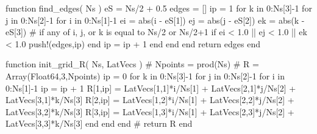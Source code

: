 \begin{juliacode}
  function find_edges( Ns )
    eS = Ns/2 + 0.5
    edges = []
    ip = 1
    for k in 0:Ns[3]-1
    for j in 0:Ns[2]-1
    for i in 0:Ns[1]-1
      ei = abs(i - eS[1])
      ej = abs(j - eS[2])
      ek = abs(k - eS[3])
      # if any of i, j, or k is equal to Ns/2 or Ns/2+1
      if ei < 1.0 || ej < 1.0 || ek < 1.0
        push!(edges,ip)
      end
      ip = ip + 1
    end
    end
    end
    return edges
  end


  function init_grid_R( Ns, LatVecs )
    #
    Npoints = prod(Ns)
    #
    R = Array(Float64,3,Npoints)
    ip = 0
    for k in 0:Ns[3]-1
    for j in 0:Ns[2]-1
    for i in 0:Ns[1]-1
      ip = ip + 1
      R[1,ip] = LatVecs[1,1]*i/Ns[1] + LatVecs[2,1]*j/Ns[2] + LatVecs[3,1]*k/Ns[3]
      R[2,ip] = LatVecs[1,2]*i/Ns[1] + LatVecs[2,2]*j/Ns[2] + LatVecs[3,2]*k/Ns[3]
      R[3,ip] = LatVecs[1,3]*i/Ns[1] + LatVecs[2,3]*j/Ns[2] + LatVecs[3,3]*k/Ns[3]
    end
    end
    end
    #
    return R
  end
\end{juliacode}
